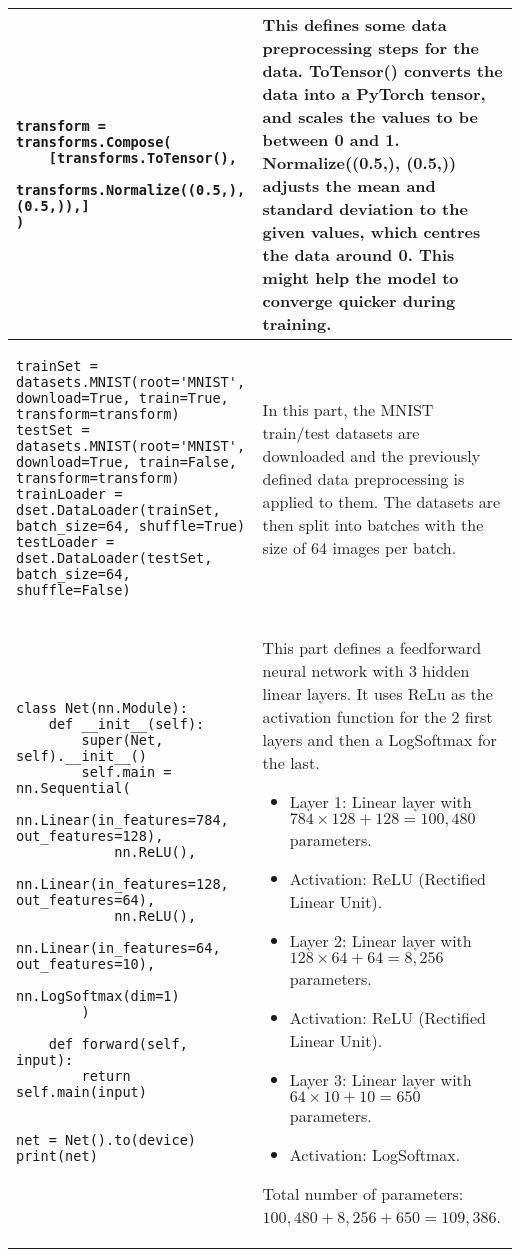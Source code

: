 \begin{longtable}{|m{}|m{}|}
\begin{lstlisting}
transform = transforms.Compose(
    [transforms.ToTensor(),
     transforms.Normalize((0.5,), (0.5,)),]
)
\end{lstlisting} & This defines some data preprocessing steps for the data. ToTensor() converts the data into a PyTorch tensor, and scales the values to be between 0 and 1. Normalize((0.5,), (0.5,)) adjusts the mean and standard deviation to the given values, which centres the data around 0. This might help the model to converge quicker during training.\\ \hline

\begin{lstlisting}
trainSet = datasets.MNIST(root='MNIST', download=True, train=True, transform=transform)
testSet = datasets.MNIST(root='MNIST', download=True, train=False, transform=transform)
trainLoader = dset.DataLoader(trainSet, batch_size=64, shuffle=True)
testLoader = dset.DataLoader(testSet, batch_size=64, shuffle=False)
\end{lstlisting} & In this part, the MNIST train/test datasets are downloaded and the previously defined data preprocessing is applied to them. The datasets are then split into batches with the size of 64 images per batch. \\ \hline


\begin{lstlisting}
class Net(nn.Module):
    def __init__(self):
        super(Net, self).__init__()
        self.main = nn.Sequential(
            nn.Linear(in_features=784, out_features=128),
            nn.ReLU(),
            nn.Linear(in_features=128, out_features=64),
            nn.ReLU(),
            nn.Linear(in_features=64, out_features=10),
            nn.LogSoftmax(dim=1)
        )

    def forward(self, input):
        return self.main(input)


net = Net().to(device)
print(net)
\end{lstlisting} & This part defines a feedforward neural network with 3 hidden linear layers. It uses ReLu as the activation function for the 2 first layers and then a LogSoftmax for the last. 
\begin{itemize}
    \item Layer 1: Linear layer with \(784 \times 128 + 128 = 100,480\) parameters.
    \item Activation: ReLU (Rectified Linear Unit).
    \item Layer 2: Linear layer with \(128 \times 64 + 64 = 8,256\) parameters.
    \item Activation: ReLU (Rectified Linear Unit).
    \item Layer 3: Linear layer with \(64 \times 10 + 10 = 650\) parameters.
    \item Activation: LogSoftmax.
\end{itemize}
Total number of parameters: \(100,480 + 8,256 + 650 = 109,386\).


\end{longtable}
